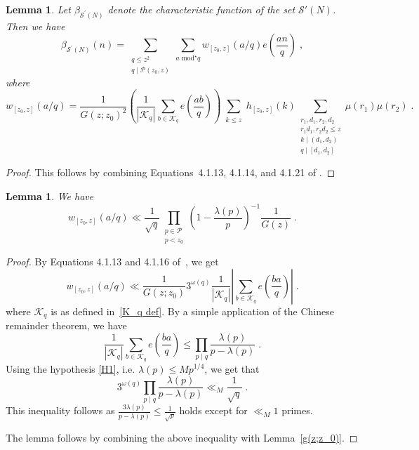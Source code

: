 \documentclass[12pt,article]{amsart}
\newtheorem{lemma}[theorem]{Lemma}
\theoremstyle{remark}
\numberwithin{equation}{section}
\begin{document}
	\begin{lemma}
		\label{lembeta}
		Let $\beta_{\mathcal{{S}^{\prime}}(N)}$ denote the characteristic function of the set $\mathcal{S'}(N)$. Then we have 
		\begin{equation}
			\label{betaS}
			\beta_{\mathcal{S}^{\prime}(N)}(n)=\sum_{\substack{q\leq z^2\\ q\mid \mathcal{P}(z_0,z)}} \sum_{a\;  \text{mod}^\star q}w_{[z_0,z]}(a/q)e\left(\frac{an}{q}\right)\; ,
		\end{equation}
		where \[ w_{[z_0,z ]}(a/q)=\frac{1}{G(z; z_0)^2}\left(\frac{1}{|\mathcal{K}_q|}\sum_{b\in \mathcal{K}_q}e\left(\frac{ab}{q}\right)\right)\sum_{\substack{k\leq z}}h_{[z_0,z]}(k)\sum_{\substack {r_1,d_1,r_2,d_2\\ r_1d_1, r_2d_2\leq z\\ k\mid (d_1, d_2)\\ q\mid [d_1, d_2]}}\mu(r_1)\mu(r_2)\; .\]
		
	\end{lemma}
	\begin{proof}
		This follows by combining  Equations~4.1.13, 4.1.14, and 4.1.21 of \cite{Ramare-ruzsa}.
		
	\end{proof}
	\begin{lemma}
		\label{w_qbound}
		We have 
		\[
		w_{[z_0,z]}(a/q) \ll \frac{1}{\sqrt{q}} \prod_{\substack{p\in \mathcal{P}\\ p<z_0}}\left(1-\frac{\lambda(p)}{p}\right)^{-1}\frac{1}{G(z)}\; .
		\]
	\end{lemma}
	\begin{proof}
		By Equations 4.1.13 and 4.1.16 of~\cite{Ramare-ruzsa}, we get
		\[
		w_{[z_0,z]}(a/q)\ll \frac{1}{G(z;z_0)}3^{\omega(q)}\frac{1}{|\mathcal{K}_q|}\left|\sum_{b\in \mathcal{K}_q}e\left(\frac{ba}{q}\right)\right|\; .
		\]
		where $\mathcal{K}_q$ is as defined in~\eqref{K_q def}.
		By a simple application of the Chinese remainder theorem, we have
		\[
		\frac{1}{|\mathcal{K}_q|}\sum_{b\in \mathcal{K}_q}e\left(\frac{ba}{q}\right)\leq \prod_{p\mid q}\frac{\lambda(p)}{p-\lambda(p)}\; .
		\]
		Using the hypothesis \eqref{H1}, i.e.  $\lambda(p)\leq M p^{1/4}$, we get that
		\[3^{\omega(q)}\prod_{p\mid q}\frac{\lambda(p)}{p-\lambda(p)}\ll_{M} \frac{1}{\sqrt{q}}\;. 
		\]
		This inequality follows as $\frac{3\lambda(p)}{p-\lambda(p)}\leq \frac{1}{\sqrt{p}}$ holds except for $\ll_{M}1$ primes.
		
		\vspace{2mm}
		\noindent
		The lemma follows by combining the above inequality with Lemma~\ref{g(z;z_0)}.
	\end{proof}
	
\end{document}
